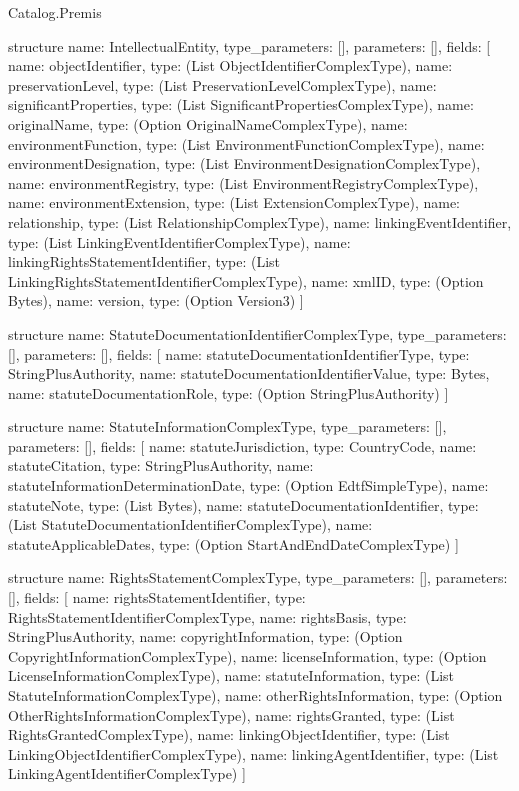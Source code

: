 \begin{lexlean}{Catalog.Premis}
\begin{semanticmodule}
structure{
  name: IntellectualEntity,
  type_parameters: [],
  parameters: [],
  fields: [
    {name: objectIdentifier, type: (List ObjectIdentifierComplexType)},
    {name: preservationLevel, type: (List PreservationLevelComplexType)},
    {name: significantProperties, type: (List SignificantPropertiesComplexType)},
    {name: originalName, type: (Option OriginalNameComplexType)},
    {name: environmentFunction, type: (List EnvironmentFunctionComplexType)},
    {name: environmentDesignation, type: (List EnvironmentDesignationComplexType)},
    {name: environmentRegistry, type: (List EnvironmentRegistryComplexType)},
    {name: environmentExtension, type: (List ExtensionComplexType)},
    {name: relationship, type: (List RelationshipComplexType)},
    {name: linkingEventIdentifier, type: (List LinkingEventIdentifierComplexType)},
    {name: linkingRightsStatementIdentifier, type: (List LinkingRightsStatementIdentifierComplexType)},
    {name: xmlID, type: (Option Bytes)},
    {name: version, type: (Option Version3)}
  ]
}

structure{
  name: StatuteDocumentationIdentifierComplexType,
  type_parameters: [],
  parameters: [],
  fields: [
    {name: statuteDocumentationIdentifierType, type: StringPlusAuthority},
    {name: statuteDocumentationIdentifierValue, type: Bytes},
    {name: statuteDocumentationRole, type: (Option StringPlusAuthority)}
  ]
}

structure{
  name: StatuteInformationComplexType,
  type_parameters: [],
  parameters: [],
  fields: [
    {name: statuteJurisdiction, type: CountryCode},
    {name: statuteCitation, type: StringPlusAuthority},
    {name: statuteInformationDeterminationDate, type: (Option EdtfSimpleType)},
    {name: statuteNote, type: (List Bytes)},
    {name: statuteDocumentationIdentifier, type: (List StatuteDocumentationIdentifierComplexType)},
    {name: statuteApplicableDates, type: (Option StartAndEndDateComplexType)}
  ]
}

structure{
  name: RightsStatementComplexType,
  type_parameters: [],
  parameters: [],
  fields: [
    {name: rightsStatementIdentifier, type: RightsStatementIdentifierComplexType},
    {name: rightsBasis, type: StringPlusAuthority},
    {name: copyrightInformation, type: (Option CopyrightInformationComplexType)},
    {name: licenseInformation, type: (Option LicenseInformationComplexType)},
    {name: statuteInformation, type: (List StatuteInformationComplexType)},
    {name: otherRightsInformation, type: (Option OtherRightsInformationComplexType)},
    {name: rightsGranted, type: (List RightsGrantedComplexType)},
    {name: linkingObjectIdentifier, type: (List LinkingObjectIdentifierComplexType)},
    {name: linkingAgentIdentifier, type: (List LinkingAgentIdentifierComplexType)}
  ]
}


\end{semanticmodule}
\end{lexlean}
